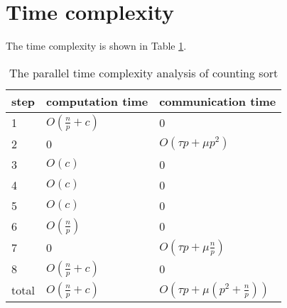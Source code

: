\documentclass[12pt]{article}
\begin{document}
\section{Time complexity}
The time complexity is shown in Table \ref{tab:complexity}.
\begin{table}[htb]
  \centering
  \begin{tabularx}{\textwidth}{|l|l|X|} \hline
    step & computation time & communication time \\ \hline
    1 & $O(\frac{n}{p}+c)$ & 0  \\ \hline
    2 & 0 & $O(\tau p + \mu p^2)$ \\ \hline
    3 & $O(c)$ & 0 \\ \hline
    4 & $O(c)$ & 0 \\ \hline
    5 & $O(c)$ & 0 \\ \hline
    6 & $O(\frac{n}{p})$ & 0 \\ \hline
    7 & 0 & $O(\tau p + \mu \frac{n}{p})$ \\ \hline
    8 & $O(\frac{n}{p}+c)$ & 0 \\ \hline
    total & $O(\frac{n}{p}+c)$ & $O(\tau p + \mu (p^2+\frac{n}{p}))$ \\ \hline
  \end{tabularx}
  \caption{The parallel time complexity analysis of counting sort}
  \label{tab:complexity}
\end{table}
\end{document}
